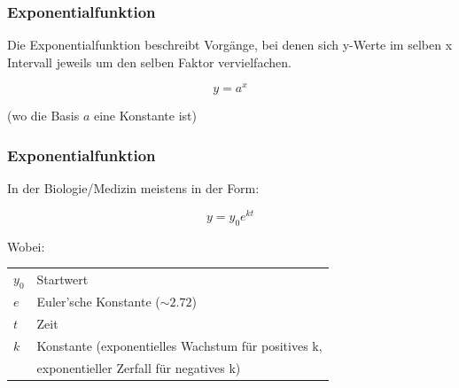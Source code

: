 \documentclass{beamer}
\begin{document}
\begin{frame}
\frametitle{Exponentialfunktion}

Die Exponentialfunktion beschreibt Vorgänge, bei denen sich y-Werte im selben x Intervall jeweils um den selben Faktor vervielfachen. 

\[
y  = a^x
\]


(wo die Basis \(a\) eine Konstante ist)





\end{frame}

\begin{frame}
\frametitle{Exponentialfunktion}

 In der Biologie/Medizin meistens in der Form:

\[
y = y_0 e^{kt}
\]

Wobei:

\begin{tabular}{ll}
\(y_0\) & Startwert \\
\(e\)   & Euler'sche Konstante (\(\sim 2.72\))  \\
\(t\)   & Zeit \\
\(k\)   & Konstante (exponentielles Wachstum für positives k, \\
        & exponentieller Zerfall für negatives k) \\
\end{tabular}


\end{frame}
\end{document}

